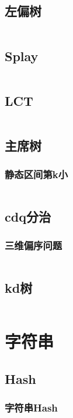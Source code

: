 \documentclass[a4paper,11pt]{article}
\begin{document}
\subsection{左偏树}
\inputminted[breaklines]{c++}{数据结构/左偏树.cpp}

\subsection{Splay}
\inputminted[breaklines]{c++}{数据结构/Splay.cpp}

\subsection{LCT}
\inputminted[breaklines]{c++}{数据结构/LCT.cpp}

\subsection{主席树}
\subsubsection{静态区间第k小}
\inputminted[breaklines]{c++}{数据结构/静态区间第k小.cpp}

\subsection{cdq分治}
\subsubsection{三维偏序问题}
\inputminted[breaklines]{c++}{数据结构/三维偏序.cpp}

\subsection{kd树}
\inputminted[breaklines]{c++}{数据结构/kd树.cpp}

\section{字符串}

\subsection{Hash}
\subsubsection{字符串Hash}
\inputminted[breaklines]{c++}{字符串/字符串Hash.cpp} 
\end{document}
